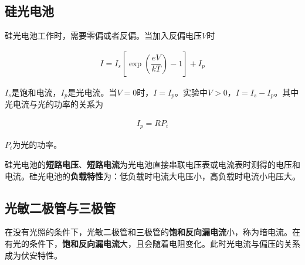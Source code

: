 \documentclass{article}
\begin{document}
\subsection{硅光电池}

硅光电池工作时，需要零偏或者反偏。当加入反偏电压$V$时

\begin{equation*}
  \begin{aligned}
    I = I_s \left[ \exp \left( \dfrac{eV}{kT}  \right) - 1 \right] + I_p
  \end{aligned}
\end{equation*}

$I_s$是饱和电流，$I_p$是光电流。当$V=0$时，$I=I_p$。实验中$V>0$，$I=I_s - I_p$。其中光电流与光的功率的关系为

\begin{equation*}
  \begin{aligned}
    I_p = R P_i
  \end{aligned}
\end{equation*}

$P_i$为光的功率。

硅光电池的\textbf{短路电压}、\textbf{短路电流}为光电池直接串联电压表或电流表时测得的电压和电流。硅光电池的\textbf{负载特性}为：低负载时电流大电压小，高负载时电流小电压大。

\subsection{光敏二极管与三极管}

在没有光照的条件下，光敏二极管和三极管的\textbf{饱和反向漏电流}小，称为暗电流。在有光的条件下，\textbf{饱和反向漏电流}大，且会随着电阻变化。此时光电流与偏压的关系成为伏安特性。
\end{document}
